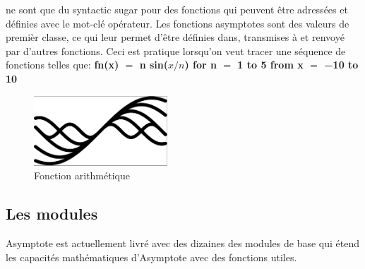\documentclass[a4paper]{report}
\begin{document}
ne sont que du syntactic sugar pour des fonctions qui peuvent être
adressées et définies avec le mot-clé opérateur.
Les fonctions asymptotes sont des valeurs de premièr classe, ce qui leur permet d'être définies dans, transmises à et
renvoyé par d'autres fonctions. Ceci est pratique lorsqu'on veut tracer une séquence de fonctions telles que:
\textbf{fn(x) $=$ n sin($x/n$) for  n $=$ 1 to 5 from x $=$ −10 to 10}\\
    \begin{figure}[!h] 
        \centering
        \includegraphics[width=5cm]{images/cap1.png}
        \caption{Fonction arithmétique} 
        \label{Fonction arithmétique}
    \end{figure}
\newpage
\subsection{Les modules}
Asymptote est actuellement livré avec des dizaines des modules de base qui étend les capacités mathématiques d'Asymptote avec des fonctions utiles.
\end{document}
